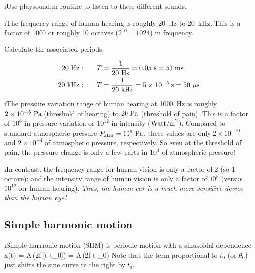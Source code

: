\i \demo Use playsound.m routine to listen to these different sounds.

\i \exer The frequency range of human hearing is roughly 
20~Hz to 20~kHz.
This is a factor of $1000$ or roughly 10 octaves 
($2^{10} = 1024$) in frequency.

Calculate the associated periods.

\ans
%
\begin{align}
20~{\rm Hz}:
\quad\quad
&T = \frac{1}{20~{\rm Hz}} = 0.05~{\rm s} = 50~{\rm ms}
\\
20~{\rm kHz}:
\quad\quad
&T = \frac{1}{20~{\rm kHz}} = 5\times 10^{-5}~{\rm s} = 50~\mu{\rm s}
\end{align}
%

\i The pressure variation range of human hearing at
1000~Hz is 
roughly $2\times 10^{-5}~{\rm Pa}$ (threshold of hearing)
to $20~{\rm Pa}$ (threshold of pain).
This is a factor of $10^6$ in pressure variation or $10^{12}$
in intensity (${\rm Watt/m}^2$).
Compared to standard atmospheric pressure $P_{\rm atm} = 10^5~{\rm Pa}$,
these values are only $2\times 10^{-10}$ and 
$2\times 10^{-4}$ of atmospheric pressure, respectively.
So even at the threshold of pain, the pressure change is only a 
few parts in $10^4$ of atmospheric pressure!

\i In contrast, the frequency range for human vision is 
only a factor of 2 (so 1 octave); 
and the intensity range of human vision is only a factor of
$10^5$ (versus $10^{12}$ for human hearing).
{\em Thus, the human ear is a much more sensitive device than the 
human eye!}

\ei

\subsection{Simple harmonic motion}
\bi

\i Simple harmonic motion (SHM) is periodic motion with
a sinusoidal dependence
%
\be
x(t) = 
A\,\sin(2\pi f [t-t_0]) = A\,\sin(2\pi f t-\theta_0)
\ee
%
Note that the term proportional to $t_0$ (or $\theta_0$) just
shifts the sine curve to the right by $t_0$.

